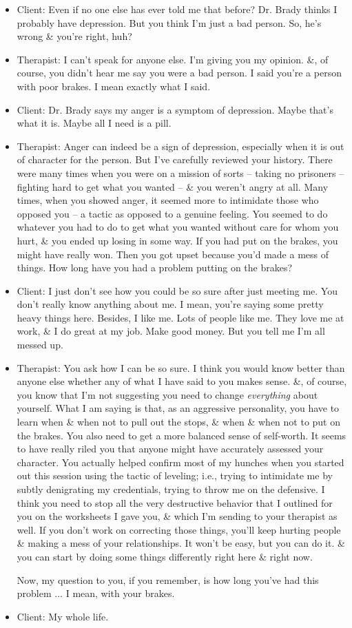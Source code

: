 \documentclass{article}
\numberwithin{equation}{section}
\begin{document}
\begin{itemize}
	\item Client: Even if no one else has ever told me that before? Dr. Brady thinks I probably have depression. But you think I'm just a bad person. So, he's wrong \& you're right, huh?
	\item Therapist: I can't speak for anyone else. I'm giving you my opinion. \&, of course, you didn't hear me say you were a bad person. I said you're a person with poor brakes. I mean exactly what I said.
	\item Client: Dr. Brady says my anger is a symptom of depression. Maybe that's what it is. Maybe all I need is a pill.
	\item Therapist: Anger can indeed be a sign of depression, especially when it is out of character for the person. But I've carefully reviewed your history. There were many times when you were on a mission of sorts -- taking no prisoners -- fighting hard to get what you wanted -- \& you weren't angry at all. Many times, when you showed anger, it seemed more to intimidate those who opposed you -- a tactic as opposed to a genuine feeling. You seemed to do whatever you had to do to get what you wanted without care for whom you hurt, \& you ended up losing in some way. If you had put on the brakes, you might have really won. Then you got upset because you'd made a mess of things. How long have you had a problem putting on the brakes?
	\item Client: I just don't see how you could be so sure after just meeting me. You don't really know anything about me. I mean, you're saying some pretty heavy things here. Besides, I like me. Lots of people like me. They love me at work, \& I do great at my job. Make good money. But you tell me I'm all messed up.
	\item Therapist: You ask how I can be so sure. I think you would know better than anyone else whether any of what I have said to you makes sense. \&, of course, you know that I'm not suggesting you need to change \textit{everything} about yourself. What I am saying is that, as an aggressive personality, you have to learn when \& when not to pull out the stops, \& when \& when not to put on the brakes. You also need to get a more balanced sense of self-worth. It seems to have really riled you that anyone might have accurately assessed your character. You actually helped confirm most of my hunches when you started out this session using the tactic of leveling; i.e., trying to intimidate me by subtly denigrating my credentials, trying to throw me on the defensive. I think you need to stop all the very destructive behavior that I outlined for you on the worksheets I gave you, \& which I'm sending to your therapist as well. If you don't work on correcting those things, you'll keep hurting people \& making a mess of your relationships. It won't be easy, but you can do it. \& you can start by doing some things differently right here \& right now.
	
	Now, my question to you, if you remember, is how long you've had this problem $\ldots$ I mean, with your brakes.
	\item Client: My whole life.
\end{itemize}
\end{document}
